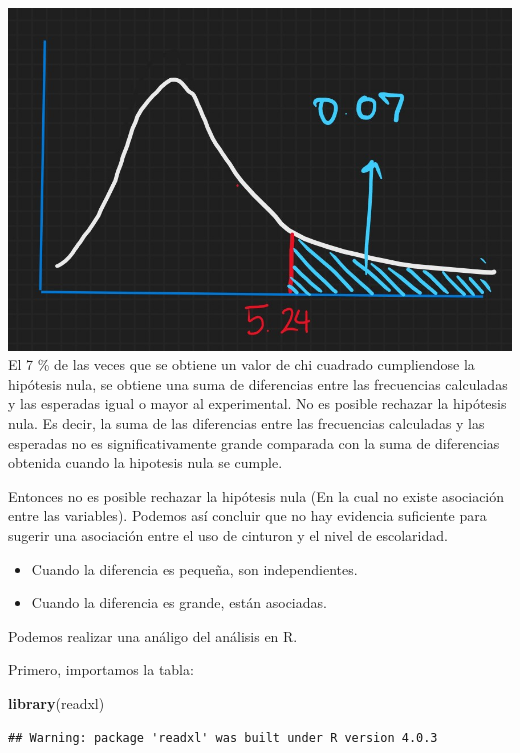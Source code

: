 \documentclass[twocolumn]{article}
\newenvironment{Shaded}{\begin{snugshade}}{\end{snugshade}}
\newcommand{\KeywordTok}[1]{\textcolor[rgb]{0.13,0.29,0.53}{\textbf{#1}}}
\newcommand{\NormalTok}[1]{#1}
\providecommand{\tightlist}{%
  \setlength{\itemsep}{0pt}\setlength{\parskip}{0pt}}
\begin{document}
\includegraphics{./img/chiDibujo.jpg} El 7 \% de las veces que se
obtiene un valor de chi cuadrado cumpliendose la hipótesis nula, se
obtiene una suma de diferencias entre las frecuencias calculadas y las
esperadas igual o mayor al experimental. No es posible rechazar la
hipótesis nula. Es decir, la suma de las diferencias entre las
frecuencias calculadas y las esperadas no es significativamente grande
comparada con la suma de diferencias obtenida cuando la hipotesis nula
se cumple.

Entonces no es posible rechazar la hipótesis nula (En la cual no existe
asociación entre las variables). Podemos así concluir que no hay
evidencia suficiente para sugerir una asociación entre el uso de
cinturon y el nivel de escolaridad.

\begin{itemize}
\tightlist
\item
  Cuando la diferencia es pequeña, son independientes.
\item
  Cuando la diferencia es grande, están asociadas.
\end{itemize}

Podemos realizar una análigo del análisis en R.

Primero, importamos la tabla:

\begin{Shaded}
\begin{Highlighting}[]
\KeywordTok{library}\NormalTok{(readxl)}
\end{Highlighting}
\end{Shaded}

\begin{verbatim}
## Warning: package 'readxl' was built under R version 4.0.3
\end{verbatim}
\end{document}
